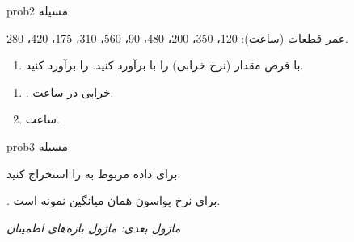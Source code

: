 \begin{PSbox}[unbreakable]{prob}{مسیله 2}

عمر قطعات (ساعت): 120، 350، 200، 480، 90، 560، 310، 175، 420، 280.

\begin{enumerate}
\def\labelenumi{(\alph{enumi})}
\tightlist
\item
  با فرض  مقدار \lr{\ensuremath{\lambda}} (نرخ خرابی) را با  برآورد کنید.  را برآورد کنید.
\end{enumerate}

\PSsolution{} 

\begin{enumerate}
\def\labelenumi{(\alph{enumi})}
\tightlist
\item
  .\PSbr{} خرابی در ساعت.
\item
   ساعت.
\end{enumerate}

\end{PSbox}

\begin{PSbox}[unbreakable]{prob}{مسیله 3}

برای داده  مربوط به \lr{\ensuremath{\lambda}} را استخراج کنید.

\PSsolution{} \PSbr{}.\PSbr{} برای نرخ پواسون همان میانگین نمونه است.

\emph{ماژول بعدی: {ماژول  بازه‌های اطمینان}}\PSbr{}

\end{PSbox}
